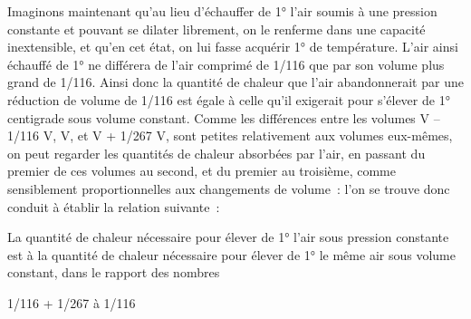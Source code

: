 \documentclass[french,twoside]{book} %
\begin{document}
Imaginons maintenant qu’au lieu d’échauffer de 1° l’air soumis à une pression constante et pouvant se dilater librement, on le renferme dans une capacité inextensible, et qu’en cet état, on lui fasse acquérir 1° de température. L’air ainsi échauffé de 1° ne différera de l’air comprimé de 1/116 que par son volume plus grand de 1/116. Ainsi donc la quantité de chaleur que l’air abandonnerait par une réduction de volume de 1/116 est égale à celle qu’il exigerait pour s’élever de 1° centigrade sous volume constant. Comme les différences entre les volumes V – 1/116 V, V, et V + 1/267 V, sont petites relativement aux volumes eux-mêmes, on peut regarder les quantités de chaleur absorbées par l’air, en passant du premier de ces volumes au second, et du premier au troisième, comme sensiblement proportionnelles aux changements de volume : l’on se trouve donc conduit à établir la relation suivante :\par
La quantité de chaleur nécessaire pour élever de 1° l’air sous pression constante est à la quantité de chaleur nécessaire pour élever de 1° le même air sous volume constant, dans le rapport des nombres\par

\begin{center}
1/116 + 1/267 à 1/116\par
\end{center}
\end{document}
